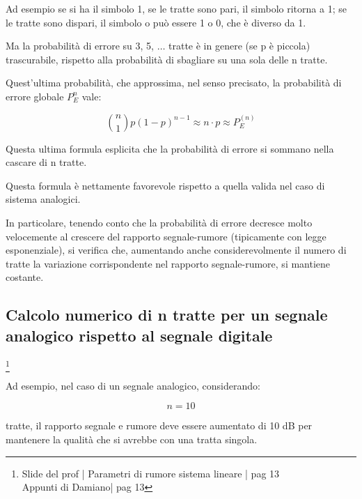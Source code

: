 Ad esempio se si ha il simbolo 1, se le tratte sono pari, il simbolo ritorna a 1; 
se le tratte sono dispari, il simbolo o può essere 1 o 0, che è diverso da 1. \newline 

Ma la probabilità di errore su 3, 5, $\dots$ tratte è in genere (se p è piccola) trascurabile, 
rispetto alla probabilità di sbagliare su una sola delle n tratte. \newline 

Quest'ultima probabilità, che approssima, nel senso precisato, la probabilità di errore globale $P_{E}^{n}$ vale: 

{
    \Large 
    \begin{equation}
        \binom{n}{1}p(1-p)^{n-1} 
        \approx 
        n \cdot p 
        \approx 
        P_{E}^{(n)}
    \end{equation}
}

Questa ultima formula esplicita che la probabilità di errore si sommano nella cascare di n tratte. \newline 

Questa formula è nettamente favorevole rispetto a quella valida nel caso di sistema analogici. \newline 

In particolare, tenendo conto che la probabilità di errore decresce molto velocemente al crescere del rapporto segnale-rumore (tipicamente con legge esponenziale), 
si verifica che, aumentando anche considerevolmente il numero di tratte la variazione corrispondente nel rapporto segnale-rumore, si mantiene costante. \newline 

\newpage 

\subsection{Calcolo numerico di n tratte per un segnale analogico rispetto al segnale digitale}
\footnote{Slide del prof | Parametri di rumore sistema lineare | pag 13\\  
Appunti di Damiano| pag 13} 

Ad esempio, nel caso di un segnale analogico, considerando: 

{
    \Large 
    \begin{equation}
        n = 10
    \end{equation}
}

tratte, il rapporto segnale e rumore deve essere aumentato di 10 dB per mantenere la qualità che si avrebbe con una tratta singola. \newline 

